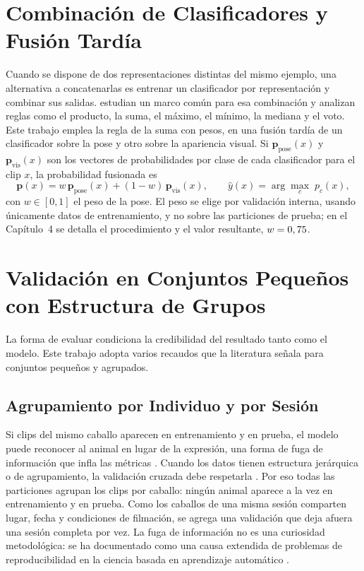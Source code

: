 \section{Combinación de Clasificadores y Fusión Tardía}
Cuando se dispone de dos representaciones distintas del mismo ejemplo, una alternativa a concatenarlas es entrenar un clasificador por representación y combinar sus salidas. \textcite{kittler1998} estudian un marco común para esa combinación y analizan reglas como el producto, la suma, el máximo, el mínimo, la mediana y el voto. Este trabajo emplea la regla de la suma con pesos, en una fusión tardía de un clasificador sobre la pose y otro sobre la apariencia visual. Si $\mathbf{p}_{\mathrm{pose}}(x)$ y $\mathbf{p}_{\mathrm{vis}}(x)$ son los vectores de probabilidades por clase de cada clasificador para el clip $x$, la probabilidad fusionada es
\begin{equation}
\mathbf{p}(x) = w\,\mathbf{p}_{\mathrm{pose}}(x) + (1-w)\,\mathbf{p}_{\mathrm{vis}}(x), \qquad
\hat{y}(x) = \arg\max_{c}\; p_c(x),
\label{eq:c3-fusion}
\end{equation}
con $w \in [0,1]$ el peso de la pose. El peso se elige por validación interna, usando únicamente datos de entrenamiento, y no sobre las particiones de prueba; en el Capítulo~4 se detalla el procedimiento y el valor resultante, $w = 0,75{}$.

\section{Validación en Conjuntos Pequeños con Estructura de Grupos}
La forma de evaluar condiciona la credibilidad del resultado tanto como el modelo. Este trabajo adopta varios recaudos que la literatura señala para conjuntos pequeños y agrupados.

\subsection{Agrupamiento por Individuo y por Sesión}
Si clips del mismo caballo aparecen en entrenamiento y en prueba, el modelo puede reconocer al animal en lugar de la expresión, una forma de fuga de información que infla las métricas \parencite{kaufman2012}. Cuando los datos tienen estructura jerárquica o de agrupamiento, la validación cruzada debe respetarla \parencite{roberts2017}. Por eso todas las particiones agrupan los clips por caballo: ningún animal aparece a la vez en entrenamiento y en prueba. Como los caballos de una misma sesión comparten lugar, fecha y condiciones de filmación, se agrega una validación que deja afuera una sesión completa por vez. La fuga de información no es una curiosidad metodológica: se ha documentado como una causa extendida de problemas de reproducibilidad en la ciencia basada en aprendizaje automático \parencite{kapoor2023}.

